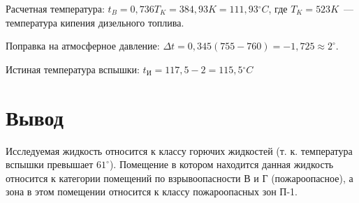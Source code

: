 Расчетная температура: $t_B=0{,}736T_K=384{,}93K=111{,}93 {}^{\circ}C$, где $T_K=523K$~--- температура кипения дизельного топлива.

Поправка на атмосферное давление: $\Delta{}t=0{,}345(755-760)=-1{,}725\approx2^{\circ}$.

Истиная температура вспышки: $t_{\text{И}}=117{,}5-2=115{,}5 {}^{\circ}C$

%
\section{Вывод}
Исследуемая жидкость относится к классу горючих жидкостей (т. к. температура вспышки превышает $61^{\circ}$). Помещение в котором находится данная жидкость относится к категории помещений по взрывоопасности В и Г (пожароопасное), а зона в этом помещении относится к классу пожароопасных зон П-1.